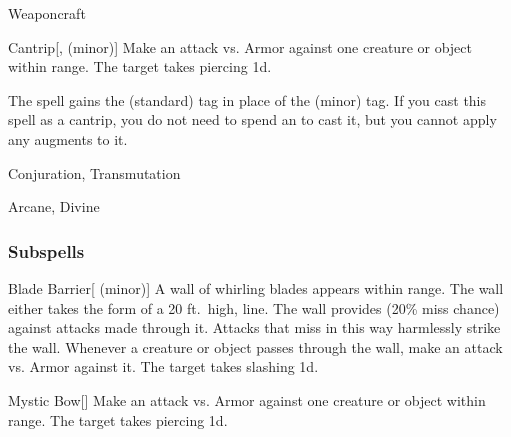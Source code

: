 \newpage
\begin{spellsection}{Weaponcraft}

\begin{spellheader}
\end{spellheader}


\begin{ability}{Cantrip}[,  (minor)]
Make an attack vs. Armor against one creature or object within \rngmed range.
\hit The target takes piercing  \minus1d.
\end{ability}



 The spell gains the  (standard) tag in place of the  (minor) tag. If you cast this spell as a cantrip,
you do not need to spend an  to cast it,
but you cannot apply any augments to it.


 Conjuration, Transmutation

 Arcane, Divine
\end{spellsection}


\subsubsection{Subspells}


\begin{ability}[\nth{1}]{Blade Barrier}[ (minor)]
A wall of whirling blades appears within \rngmed range.
The wall either takes the form of a 20 ft.\ high, \arealarge line.
The wall provides  (20\% miss chance) against attacks made through it.
Attacks that miss in this way harmlessly strike the wall.
Whenever a creature or object passes through the wall, make an attack vs. Armor against it.
\hit The target takes slashing  \minus1d.
\end{ability}
\vspace{0.25em}


\begin{ability}[\nth{1}]{Mystic Bow}[]
Make an attack vs. Armor against one creature or object within \rngmed range.
\hit The target takes piercing  \plus1d.
\end{ability}
\vspace{0.25em}


